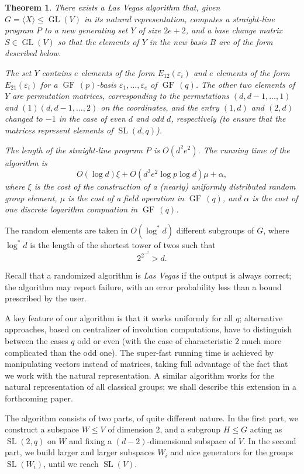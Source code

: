 \documentclass[a4paper,11pt]{article}
\def\GF{\operatorname{GF\,}}
\def\GL{\operatorname{GL}}
\def\SL{\operatorname{SL}}
\newtheorem{theorem}{Theorem}
\begin{document}
\begin{theorem}
\label{main}
There exists a Las Vegas algorithm that, given $G = \langle X \rangle \le \GL(V)$ in its natural representation, computes a straight-line program $P$ to 
a new generating set $Y$ of size $2e+2$, and a base change matrix $S \in \GL(V)$ so that the elements of $Y$ in the new basis $B$ are of the form described below.

The set $Y$ contains $e$ elements of the form $E_{12}(\varepsilon_i)$ and $e$ elements of the form $E_{21}(\varepsilon_i)$ for a $\GF(p)$-basis $\varepsilon_1,\ldots, \varepsilon_e$ of $\GF(q)$. The other two elements of $Y$ are permutation matrices, corresponding to the permutations $(d,d-1,\ldots,1)$ and $(1)(d,d-1,\ldots,2)$ on the coordinates, and the entry $(1,d)$ and $(2,d)$ changed to $-1$ in the case of even $d$ and odd $d$, respectively (to ensure that the matrices represent elements of $\SL(d,q)$).

The length of the straight-line program $P$ is $O(d^2e^2)$. The running time of the algorithm is
\[
O(\log d) \xi  +O(d^3e^2 \log p \log d)\mu +\alpha,
\]
where $\xi$ is the cost of the construction of a (nearly) uniformly distributed random group element, $\mu$ is the cost of a field operation in $\GF(q)$, and $\alpha$ is the cost of one discrete logarithm compuation in $\GF(q)$.
\end{theorem}

The random elements are taken in $O(\log^*d)$ different subgroups of $G$, where
$\log^*d$ is the length of the shortest tower of twos such that 
$$2^{2^{\cdots ^2}} >d.$$

Recall that a randomized algorithm is {\em Las Vegas} if the output is always correct; the algorithm may report failure, with an error probability less than a bound prescribed by the user.

A key feature of our algorithm is that it works uniformly for all $q$; alternative approaches, based on centralizer of involution computations, have to distinguish between the cases $q$ odd or even (with the case of characteristic $2$ much more complicated than the odd one). The super-fast running time is achieved by manipulating vectors instead of matrices, taking full advantage of the fact that we work with the natural representation. A similar algorithm works for the natural representation of all classical groups; we shall describe this extension in a forthcoming paper. 

The algorithm consists of two parts, of quite different nature. In the first part, we construct a subspace $W \le V$ of dimension $2$, and a subgroup $H \le G$ acting as $\SL(2,q)$ on $W$ and fixing a $(d-2)$-dimensional subspace of $V$. In the second part, we build larger and larger subspaces $W_i$ and nice generators for the groups $\SL(W_i)$, until we reach $\SL(V)$.
\end{document}
